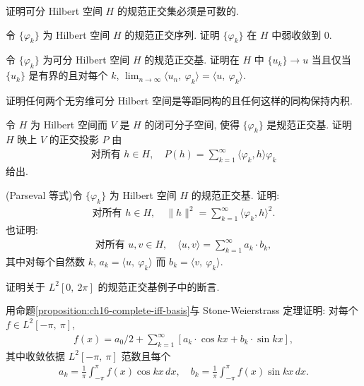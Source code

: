 \documentclass[../../main.tex]{subfiles}
\begin{document}
\begin{exercise}\label{exercise:ch16-19}
证明可分 Hilbert 空间 $H$ 的规范正交集必须是可数的.
\end{exercise}

\begin{exercise}\label{exercise:ch16-20}
令 $\{\varphi_{k}\}$ 为 Hilbert 空间 $H$ 的规范正交序列. 证明 $\{\varphi_{k}\}$ 在 $H$ 中弱收敛到 $0$.
\end{exercise}

\begin{exercise}\label{exercise:ch16-21}
令 $\{\varphi_{k}\}$ 为可分 Hilbert 空间 $H$ 的规范正交基. 证明在 $H$ 中 $\{u_{k}\}\to u$ 当且仅当 $\{u_{k}\}$ 是有界的且对每个 $k$, $\lim_{n\to\infty}\langle u_{n},\ \varphi_{k}\rangle=\langle u,\ \varphi_{k}\rangle$.
\end{exercise}

\begin{exercise}\label{exercise:ch16-22}
证明任何两个无穷维可分 Hilbert 空间是等距同构的且任何这样的同构保持内积.
\end{exercise}

\begin{exercise}\label{exercise:ch16-23}
令 $H$ 为 Hilbert 空间而 $V$ 是 $H$ 的闭可分子空间, 使得 $\{\varphi_{k}\}$ 是规范正交基. 证明 $H$ 映上 $V$ 的正交投影 $P$ 由
\begin{align*}
\text{对所有 }h\in H,\quad P(h)=\sum_{k=1}^{\infty}\langle\varphi_{k},h\rangle\varphi_{k}
\end{align*}
给出.
\end{exercise}

\begin{exercise}\label{exercise:ch16-24}
(Parseval 等式)令 $\{\varphi_{k}\}$ 为 Hilbert 空间 $H$ 的规范正交基. 证明:
\begin{align*}
\text{对所有 }h\in H,\quad\|h\|^{2}=\sum_{k=1}^{\infty}\langle\varphi_{k},h\rangle^{2}.
\end{align*}
也证明:
\begin{align*}
\text{对所有 }u,v\in H,\quad\langle u,v\rangle=\sum_{k=1}^{\infty}a_{k}\cdot b_{k},
\end{align*}
其中对每个自然数 $k$, $a_{k}=\langle u,\ \varphi_{k}\rangle$ 而 $b_{k}=\langle v,\ \varphi_{k}\rangle$.
\end{exercise}

\begin{exercise}\label{exercise:ch16-25}
证明关于 $L^{2}[0,\ 2\pi]$ 的规范正交基例子中的断言.
\end{exercise}

\begin{exercise}\label{exercise:ch16-26}
用命题\cref{proposition:ch16-complete-iff-basis}与 Stone-Weierstrass 定理证明: 对每个 $f\in L^{2}[-\pi,\ \pi]$,
\begin{align*}
f(x)=a_{0}/2+\sum_{k=1}^{\infty}[a_{k}\cdot\cos kx+b_{k}\cdot\sin kx],
\end{align*}
其中收敛依据 $L^{2}[-\pi,\ \pi]$ 范数且每个
\begin{align*}
a_{k}=\frac{1}{\pi}\int_{-\pi}^{\pi}f(x)\cos kx\,dx,\quad b_{k}=\frac{1}{\pi}\int_{-\pi}^{\pi}f(x)\sin kx\,dx.
\end{align*}
\end{exercise}
\end{document}
